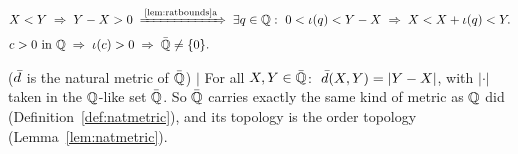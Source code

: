 \begin{align*}
&X<Y \imp Y-X>0 \by{\ref{lem:ratbounds}a} \exists q\in\Q:\ 0<\iota(q)<Y-X
\imp X<X+\iota(q)<Y.\\
&c>0 \text{ in } \Q \imp \iota(c)>0 \imp \Qb\ne\{0\}.
\end{align*}


\begin{lemma} ($\bar{d}$ is the natural metric of $\bar{\mathbb{Q}}$) $\mid$ \label{lem:natbar}
For all $X,Y\in\bar{\mathbb{Q}}$: $\ \db(X,Y)=|Y-X|$, with $|\cdot|$ taken in the
$\mathbb{Q}$-like set $\bar{\mathbb{Q}}$. So $\bar{\mathbb{Q}}$ carries exactly the same kind of metric as $\mathbb{Q}$
did (Definition~\ref{def:natmetric}), and its topology is the order topology
(Lemma~\ref{lem:natmetric}).
\end{lemma}


